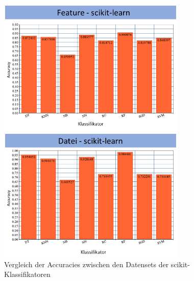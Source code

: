 \begin{figure}[]
    \centering
    \includegraphics[width=0.8\textwidth]{images/Final_scikit}
    \caption{Vergleich der Accuracies zwischen den Datensets der scikit-Klassifikatoren\label{fig:final-scikit}}
\end{figure}

